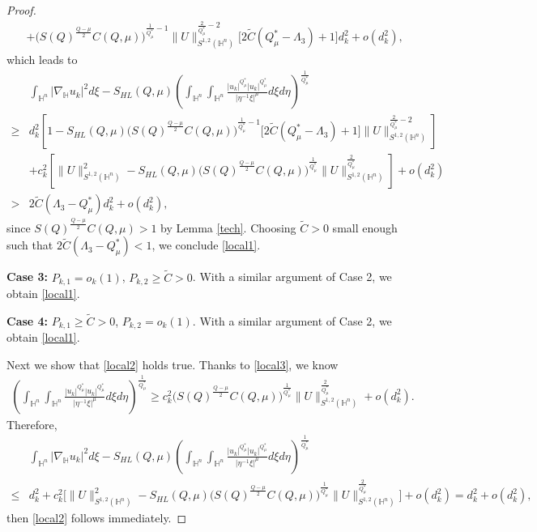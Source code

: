 \documentclass[11pt]{article}
\begin{document}
\begin{proof}
\begin{align*}
&+\Big( S(Q)^{\frac{Q-\mu}{2}}C(Q,\mu) \Big)^{\frac{1}{Q_\mu^*}-1}\|U\|^{\frac{2}{Q_\mu^*}-2}_{S^{1,2}(\mathbb{H}^{n})}\big[2\widetilde{C}(Q_{\mu}^{\ast}-\Lambda_3)+1\big]d_k^2+o(d_k^2),
    \end{align*}
    which leads to
    \begin{align*}
     & \int_{\mathbb{H}^{n}}|\nabla_{\mathbb{H}} u_k|^{2}{d}\xi-S_{HL}(Q,\mu)	\left(\int_{\mathbb{H}^{n}}\int_{\mathbb{H}^{n}}\frac{|u_k|^{Q^{\ast}_{\mu}}|u_k|
^{Q^{\ast}_{\mu}}}{|\eta^{-1}\xi|^{\mu}}{d}\xi{d}\eta\right)^{\frac{1}{Q^{\ast}_{\mu}}}\\
\geq&
d_k^2\left[1-S_{HL}(Q,\mu)\Big( S(Q)^{\frac{Q-\mu}{2}}C(Q,\mu) \Big)^{\frac{1}{Q_\mu^*}-1}\big[2\widetilde{C}(Q_{\mu}^{\ast}-\Lambda_3)+1\big]\|U\|^{\frac{2}{Q_\mu^*}-2}_{S^{1,2}(\mathbb{H}^{n})}
\right]\\
&+c_k^2\left[\|U\|^2_{{S}^{1,2}(\mathbb{H}^n)}-S_{HL}(Q,\mu)\Big( S(Q)^{\frac{Q-\mu}{2}}C(Q,\mu) \Big)^{\frac{1}{Q_\mu^*}} \|U\|^{\frac{2}{Q_\mu^*}}_{S^{1,2}(\mathbb{H}^{n})}\right]+o(d_k^2)\\
>&2\widetilde{C}(\Lambda_3-Q_{\mu}^{\ast})d_k^2+o(d_k^2),
    \end{align*}
    since $S(Q)^{\frac{Q-\mu}{2}}C(Q,\mu) >1$ by Lemma \ref{tech}. Choosing $\widetilde{C}>0$ small enough such that $2\widetilde{C}(\Lambda_3-Q_{\mu}^{\ast})<1$, we conclude \eqref{local1}.





    \textbf{Case 3:} $P_{k,1}=o_k(1)$, $P_{k,2}\geq \widetilde{C}>0$. With a similar argument of Case 2, we obtain \eqref{local1}.

    \textbf{Case 4:} $P_{k,1}\geq \widetilde{C}>0$, $P_{k,2}=o_k(1)$. With a similar argument of Case 2, we obtain \eqref{local1}.


    Next we show that \eqref{local2}  holds true. Thanks to \eqref{local3}, we know
    \begin{align*}
      \left(\int_{\mathbb{H}^{n}}\int_{\mathbb{H}^{n}}\frac{|u_k|^{Q^{\ast}_{\mu}}|u_k|
^{Q^{\ast}_{\mu}}}{|\eta^{-1}\xi|^{\mu}}{d}\xi{d}\eta\right)^{\frac{1}{Q_\mu^*}}
\geq c_k^{2} \Big( S(Q)^{\frac{Q-\mu}{2}}C(Q,\mu) \Big)^{\frac{1}{Q_\mu^*}}\|U\|^{\frac{2}{Q_\mu^*}}_{S^{1,2}(\mathbb{H}^{n})}+o(d_k^2).
    \end{align*}
    Therefore,
    \begin{align*}
     & \int_{\mathbb{H}^{n}}|\nabla_{\mathbb{H}} u_k|^{2}{d}\xi-S_{HL}(Q,\mu)	\left(\int_{\mathbb{H}^{n}}\int_{\mathbb{H}^{n}}\frac{|u_k|^{Q^{\ast}_{\mu}}|u_k|
^{Q^{\ast}_{\mu}}}{|\eta^{-1}\xi|^{\mu}}{d}\xi{d}\eta\right)^{\frac{1}{Q^{\ast}_{\mu}}}\\
\leq&
d_k^2+c_k^2\bigg[\|U\|^2_{{S}^{1,2}(\mathbb{H}^n)}-S_{HL}(Q,\mu)\Big( S(Q)^{\frac{Q-\mu}{2}}C(Q,\mu) \Big)^{\frac{1}{Q_\mu^*}} \|U\|^{\frac{2}{Q_\mu^*}}_{S^{1,2}(\mathbb{H}^{n})}\bigg]+o(d_k^2)
=d_k^2+o(d_k^2),
    \end{align*}
    then \eqref{local2} follows immediately.
\end{proof}
\end{document}
